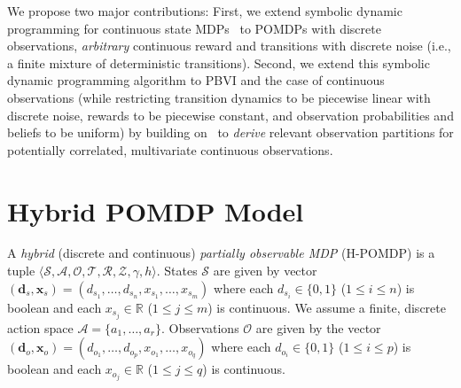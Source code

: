 \documentclass{article} %
\renewcommand{\vec}[1]{\mathbf{#1}} %
\begin{document}
We propose two major contributions:  First, we extend
symbolic dynamic programming for continuous state
MDPs~\cite{sanner_uai11} to POMDPs with discrete 
observations, 
\emph{arbitrary} continuous reward and transitions with discrete noise
(i.e., a finite mixture of deterministic transitions).  Second, we
extend this symbolic dynamic programming algorithm to PBVI and the case of
continuous observations (while restricting 
transition dynamics to be piecewise linear with discrete noise, rewards to be
piecewise constant, and observation probabilities and 
beliefs to be uniform) by building 
on~\cite{pascal_ijcai05} to \emph{derive} relevant observation
partitions for potentially correlated, multivariate continuous
observations. %



\section{Hybrid POMDP Model} 

\label{sec:model}

A \emph{hybrid} (discrete and continuous)
\emph{partially observable MDP} (H-POMDP) is a tuple $\langle
\mathcal{S},\mathcal{A},\mathcal{O},\mathcal{T},\mathcal{R},\mathcal{Z},\gamma,h
\rangle$.  States $\mathcal{S}$ are given by vector 
$(\vec{d}_s,\vec{x}_s) = (
d_{s_1},\ldots,d_{s_n},x_{s_1},\ldots,x_{s_m} )$ where each $d_{s_i}
\in \{ 0,1 \}$ ($1 \leq i \leq n$) is boolean and each
$x_{s_j} \in \mathbb{R}$ ($1 \leq j \leq m$) is continuous.
We assume a finite, discrete action space $\mathcal{A} = \{ a_1,
\ldots, a_r \}$. Observations
$\mathcal{O}$ are given by the vector $(\vec{d}_o,\vec{x}_o) = (
d_{o_1},\ldots,d_{o_p},x_{o_1},\ldots,x_{o_q} )$ where each $d_{o_i}
\in \{ 0,1 \}$ ($1 \leq i \leq p$) is boolean and each $x_{o_j} \in
\mathbb{R}$ ($1 \leq j \leq q$) is continuous.
\end{document}
